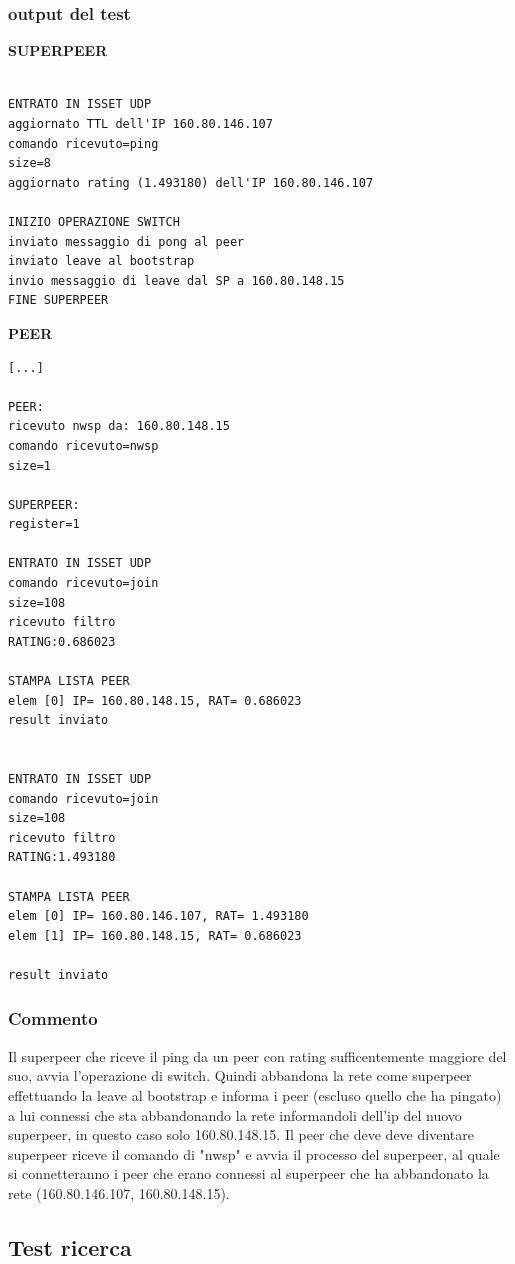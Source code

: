 \subsubsection{output del test}
\textbf{SUPERPEER}
\begin{verbatim}

ENTRATO IN ISSET UDP
aggiornato TTL dell'IP 160.80.146.107 
comando ricevuto=ping
size=8
aggiornato rating (1.493180) dell'IP 160.80.146.107 

INIZIO OPERAZIONE SWITCH
inviato messaggio di pong al peer
inviato leave al bootstrap
invio messaggio di leave dal SP a 160.80.148.15
FINE SUPERPEER

\end{verbatim}
\textbf{PEER}
\begin{verbatim}
[...]

PEER:	
ricevuto nwsp da: 160.80.148.15
comando ricevuto=nwsp
size=1

SUPERPEER:
register=1

ENTRATO IN ISSET UDP
comando ricevuto=join
size=108
ricevuto filtro
RATING:0.686023

STAMPA LISTA PEER
elem [0] IP= 160.80.148.15, RAT= 0.686023
result inviato


ENTRATO IN ISSET UDP
comando ricevuto=join
size=108
ricevuto filtro
RATING:1.493180

STAMPA LISTA PEER
elem [0] IP= 160.80.146.107, RAT= 1.493180
elem [1] IP= 160.80.148.15, RAT= 0.686023

result inviato

\end{verbatim}

\subsubsection{Commento}
Il superpeer che riceve il ping da un peer con rating sufficentemente maggiore del suo, avvia l'operazione di switch. Quindi abbandona la rete come superpeer effettuando la leave al bootstrap e informa i peer (escluso quello che ha pingato) a lui connessi che sta abbandonando la rete informandoli dell'ip del nuovo superpeer, in questo caso solo 160.80.148.15.\linebreak
Il peer che deve deve diventare superpeer riceve il comando di "nwsp" e avvia il processo del superpeer, al quale si connetteranno i peer che erano connessi al superpeer che ha abbandonato la rete (160.80.146.107, 160.80.148.15).


\subsection{Test ricerca}
